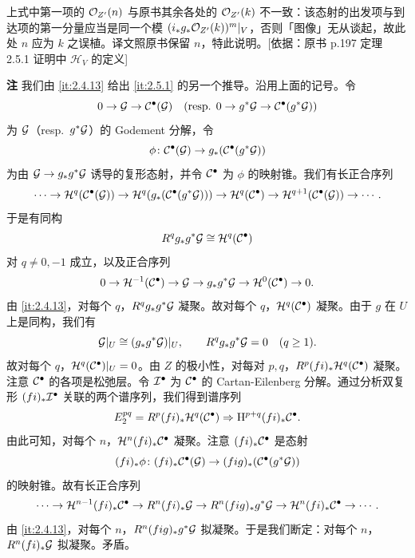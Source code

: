 \begin{tnote}
上式中第一项的 $\mathcal{O}_{Z'}(n)$ 与原书其余各处的 $\mathcal{O}_{Z'}(k)$ 不一致：该态射的出发项与到达项的第一分量应当是同一个模 $(i_*g_*\mathcal{O}_{Z'}(k))^m|_V$，否则「图像」无从谈起，故此处 $n$ 应为 $k$ 之误植。译文照原书保留 $n$，特此说明。[依据：原书 p.197 定理 2.5.1 证明中 $\mathcal{H}_V$ 的定义]
\end{tnote}
\noindent\textbf{注}
我们由 \ref{it:2.4.13} 给出 \ref{it:2.5.1} 的另一个推导。沿用上面的记号。令
\[
0\to\mathcal{G}\to\mathcal{C}^\bullet(\mathcal{G})\quad(\text{resp. } 0\to g^*\mathcal{G}\to\mathcal{C}^\bullet(g^*\mathcal{G}))
\]
为 $\mathcal{G}$（resp.\ $g^*\mathcal{G}$）的 Godement 分解，令
\[
\phi\colon\mathcal{C}^\bullet(\mathcal{G})\to g_*(\mathcal{C}^\bullet(g^*\mathcal{G}))
\]
为由 $\mathcal{G}\to g_*g^*\mathcal{G}$ 诱导的复形态射，并令 $\mathcal{C}^\bullet$ 为 $\phi$ 的映射锥。我们有长正合序列
\[
\cdots\to\mathcal{H}^q(\mathcal{C}^\bullet(\mathcal{G}))\to\mathcal{H}^q(g_*(\mathcal{C}^\bullet(g^*\mathcal{G})))\to\mathcal{H}^q(\mathcal{C}^\bullet)\to\mathcal{H}^{q+1}(\mathcal{C}^\bullet(\mathcal{G}))\to\cdots.
\]
于是有同构
\[
R^qg_*g^*\mathcal{G}\cong\mathcal{H}^q(\mathcal{C}^\bullet)
\]
对 $q\neq 0,-1$ 成立，以及正合序列
\[
0\to\mathcal{H}^{-1}(\mathcal{C}^\bullet)\to\mathcal{G}\to g_*g^*\mathcal{G}\to\mathcal{H}^0(\mathcal{C}^\bullet)\to 0.
\]
由 \ref{it:2.4.13}，对每个 $q$，$R^qg_*g^*\mathcal{G}$ 凝聚。故对每个 $q$，$\mathcal{H}^q(\mathcal{C}^\bullet)$ 凝聚。由于 $g$ 在 $U$ 上是同构，我们有
\[
\mathcal{G}|_U\cong(g_*g^*\mathcal{G})|_U,\qquad R^qg_*g^*\mathcal{G}=0\quad(q\ge 1).
\]
故对每个 $q$，$\mathcal{H}^q(\mathcal{C}^\bullet)|_U=0$。由 $Z$ 的极小性，对每对 $p,q$，$R^p(fi)_*\mathcal{H}^q(\mathcal{C}^\bullet)$ 凝聚。注意 $\mathcal{C}^\bullet$ 的各项是松弛层。令 $\mathcal{I}^\bullet$ 为 $\mathcal{C}^\bullet$ 的 Cartan-Eilenberg 分解。通过分析双复形 $(fi)_*\mathcal{I}^\bullet$ 关联的两个谱序列，我们得到谱序列
\[
E_2^{pq}=R^p(fi)_*\mathcal{H}^q(\mathcal{C}^\bullet)\Rightarrow \mathrm{H}^{p+q}(fi)_*\mathcal{C}^\bullet.
\]
由此可知，对每个 $n$，$\mathcal{H}^n(fi)_*\mathcal{C}^\bullet$ 凝聚。注意 $(fi)_*\mathcal{C}^\bullet$ 是态射
\[
(fi)_*\phi\colon(fi)_*\mathcal{C}^\bullet(\mathcal{G})\to(fig)_*(\mathcal{C}^\bullet(g^*\mathcal{G}))
\]
的映射锥。故有长正合序列
\[
\cdots\to\mathcal{H}^{n-1}(fi)_*\mathcal{C}^\bullet\to R^n(fi)_*\mathcal{G}\to R^n(fig)_*g^*\mathcal{G}\to\mathcal{H}^n(fi)_*\mathcal{C}^\bullet\to\cdots.
\]
由 \ref{it:2.4.13}，对每个 $n$，$R^n(fig)_*g^*\mathcal{G}$ 拟凝聚。于是我们断定：对每个 $n$，$R^n(fi)_*\mathcal{G}$ 拟凝聚。矛盾。

